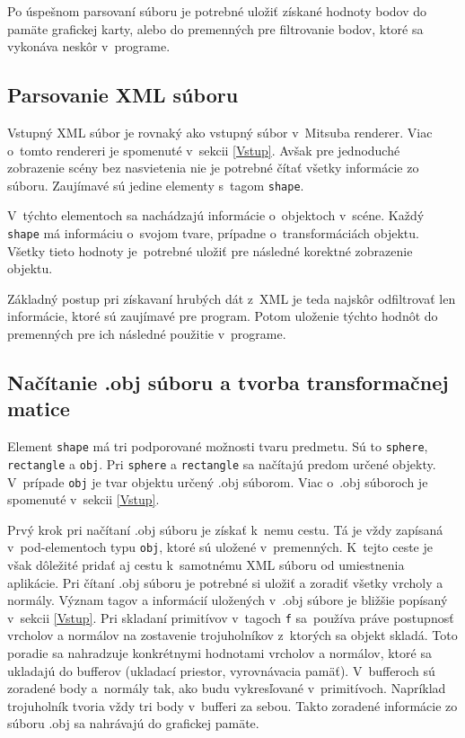 Po úspešnom parsovaní súboru je potrebné uložiť získané hodnoty bodov do pamäte grafickej karty, alebo do premenných pre filtrovanie bodov, ktoré sa vykonáva neskôr v~programe.

\subsection*{Parsovanie XML súboru}
\label{XMLParse}
Vstupný XML súbor je rovnaký ako vstupný súbor v~Mitsuba renderer. Viac o~tomto rendereri je spomenuté v~sekcii \ref{Vstup}. Avšak pre jednoduché zobrazenie scény bez nasvietenia nie je potrebné čítať všetky informácie zo súboru. Zaujímavé sú jedine elementy s~tagom \verb|shape|.

V~týchto elementoch sa nachádzajú informácie o~objektoch v~scéne. Každý \verb|shape| má informáciu o~svojom tvare, prípadne o~transformáciách objektu. Všetky tieto hodnoty je~potrebné uložiť pre následné korektné zobrazenie objektu.

Základný postup pri získavaní hrubých dát z~XML je teda najskôr odfiltrovať len informácie, ktoré sú zaujímavé pre program. Potom uloženie týchto hodnôt do premenných pre ich následné použitie v~programe.

\subsection*{Načítanie .obj súboru a tvorba transformačnej matice}
\label{OBJNavrh}
Element \verb|shape| má tri podporované možnosti tvaru predmetu. Sú to \verb|sphere|, \verb|rectangle| a \verb|obj|. Pri \verb|sphere| a \verb|rectangle| sa načítajú predom určené objekty. V~prípade \verb|obj| je tvar objektu určený .obj súborom. Viac o~.obj súboroch je spomenuté v~sekcii \ref{Vstup}.

Prvý krok pri načítaní .obj súboru je získať k~nemu cestu. Tá je vždy zapísaná v~pod-elementoch typu \verb|obj|, ktoré sú uložené v~premenných. K~tejto ceste je však dôležité pridať aj cestu k~samotnému XML súboru od umiestnenia aplikácie. Pri čítaní .obj súboru je potrebné si uložiť a zoradiť všetky vrcholy a normály. Význam tagov a informácií uložených v~.obj súbore je bližšie popísaný v~sekcii \ref{Vstup}. Pri skladaní primitívov v~tagoch \verb|f| sa~používa práve postupnosť vrcholov a normálov na zostavenie trojuholníkov z~ktorých sa objekt skladá. Toto poradie sa nahradzuje konkrétnymi hodnotami vrcholov a normálov, ktoré sa ukladajú do bufferov (ukladací priestor, vyrovnávacia pamäť). V~bufferoch sú zoradené body a~normály tak, ako budu vykresľované v~primitívoch. Napríklad trojuholník tvoria vždy tri body v~bufferi za sebou. Takto zoradené informácie zo súboru .obj sa nahrávajú do grafickej pamäte.

